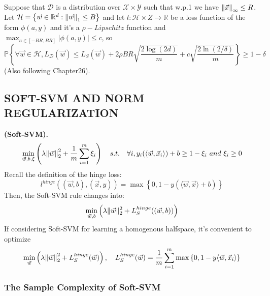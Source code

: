 \begin{theorem}
    Suppose that $ \mathcal{D} $ is a distribution over $ \mathcal{X}\times \mathcal{Y} $ such that w.p.1 we have
    $ {\Arrowvert \vec{x}  \Arrowvert}_\infty \le R $. Let $ \mathcal{H} = \left\{ \vec{w} \in \mathbb{R}^d : {\Arrowvert \vec{w}  \Arrowvert}_1 \le B \right\} $ and let $ l: \mathcal{H} \times Z \rightarrow \mathbb{R} $ be a loss function of the form $ \phi(a,y) $ and it's a $ \rho-Lipschitz $ function and $ \max_{a \in [-BR, BR]} \left| \phi(a, y) \right| \le c$, so
    \[
    \mathbb{P} \left\{ \forall \vec{w} \in \mathcal{H}, L_{ \mathcal{D} }( \vec{w} )
    \le L_S( \vec{w} ) + 2 \rho BR \sqrt{ \frac{2\log(2d)}{m} }+ c \sqrt{ \frac{2 \ln(2/\delta)}{m} }\right\}
    \ge 1 - \delta
    \]
    (Also following Chapter26).
\end{theorem}

\subsection{SOFT-SVM AND NORM REGULARIZATION}%
\label{sub:soft_svm_and_norm_regularization}

\begin{definition}
    \textbf{(Soft-SVM).}
    \[
        \min_{ \vec{w}, b, \xi} \left( \lambda {\Arrowvert \vec{w}  \Arrowvert}_2^2 + \frac{1}{m} \sum^{m}_{i=1} \xi_i \right) \quad
        s.t.\quad \forall i, y_i ( \langle \vec{w} , \vec{x} _i \rangle) + b \ge 1- \xi_i\ and\ \xi_i \ge 0
    \]
    Recall the definition of the hinge loss:
    \[
        l^{hinge} (( \vec{w} , b), ( \vec{x} , y) )  = \max \left\{ 0, 1 - y( \langle \vec{w} , \vec{x} \rangle + b) \right\}
    \]
    Then, the Soft-SVM rule changes into:
    \[
        \min_{ \vec{w}, b} \left( \lambda \Arrowvert \vec{w}  \Arrowvert^2_2 + L^{hinge}_S(( \vec{w}, b)) \right)
    \]
    If considering Soft-SVM for learning a homogenous halfspace, it's convenient to optimize
    \[
        \min_{ \vec{w} } \left( \lambda {\Arrowvert \vec{w}  \Arrowvert}_2^2 + L^{hinge}_S( \vec{w} ) \right),
        \quad
        L^{hinge}_S( \vec{w} ) = \frac{1}{m} \sum^{m}_{i=1} \max \left\{ 0, 1- y \langle \vec{w}, \vec{x}_i \rangle \right\}
    \]
\end{definition}

\subsubsection{The Sample Complexity of Soft-SVM}%

